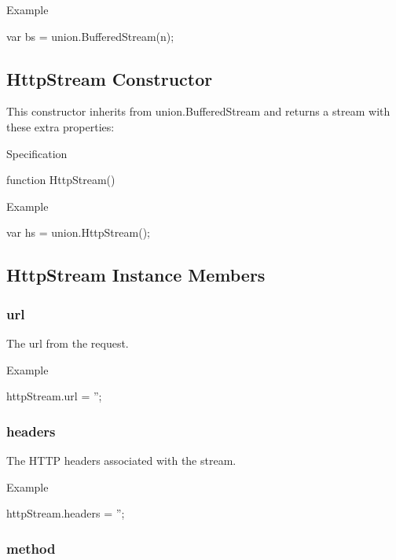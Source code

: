 Example


\begin{DoxyCode}
var bs = union.BufferedStream(n);
\end{DoxyCode}


\subsection*{Http\+Stream Constructor}

This constructor inherits from {\ttfamily union.\+Buffered\+Stream} and returns a stream with these extra properties\+:

Specification


\begin{DoxyCode}
function HttpStream()
\end{DoxyCode}


Example


\begin{DoxyCode}
var hs = union.HttpStream();
\end{DoxyCode}


\subsection*{Http\+Stream Instance Members}

\subsubsection*{url}

The url from the request.

Example


\begin{DoxyCode}
httpStream.url = '';
\end{DoxyCode}


\subsubsection*{headers}

The H\+T\+TP headers associated with the stream.

Example


\begin{DoxyCode}
httpStream.headers = '';
\end{DoxyCode}


\subsubsection*{method}

